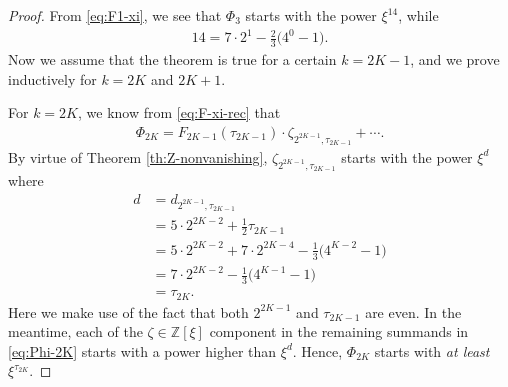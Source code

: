 \documentclass[12pt,reqno]{amsart}
\numberwithin{equation}{section}
\theoremstyle{theorem}
\theoremstyle{definition}
\begin{document}
\begin{proof}
	From \eqref{eq:F1-xi}, we see that $\Phi_3$ starts with the power $\xi^{14}$, while
	\begin{align*}
		14 = 7\cdot 2^1 - \tfrac{2}{3}\big(4^0-1\big).
	\end{align*}
	Now we assume that the theorem is true for a certain $k=2K-1$, and we prove inductively for $k=2K$ and $2K+1$.
	
	For $k=2K$, we know from \eqref{eq:F-xi-rec} that
	\begin{align}\label{eq:Phi-2K}
		\Phi_{2K} = F_{2K-1}(\tau_{2K-1}) \cdot \zeta_{2^{2K-1},\tau_{2K-1}} + \cdots.
	\end{align}
	By virtue of Theorem \ref{th:Z-nonvanishing}, $\zeta_{2^{2K-1},\tau_{2K-1}}$ starts with the power $\xi^{d}$ where
	\begin{align*}
		d&=d_{2^{2K-1},\tau_{2K-1}}\\
		&=5\cdot 2^{2K-2}+\tfrac{1}{2}\tau_{2K-1}\\
		&=5\cdot 2^{2K-2}+7\cdot 2^{2K-4}-\tfrac{1}{3}\big(4^{K-2}-1\big)\\
		&=7\cdot 2^{2K-2}-\tfrac{1}{3}\big(4^{K-1}-1\big)\\
		&=\tau_{2K}.
	\end{align*}
	Here we make use of the fact that both $2^{2K-1}$ and $\tau_{2K-1}$ are even. In the meantime, each of the $\zeta \in \mathbb{Z}[\xi]$ component in the remaining summands in \eqref{eq:Phi-2K} starts with a power higher than $\xi^d$. Hence, $\Phi_{2K}$ starts with \emph{at least} $\xi^{\tau_{2K}}$.
	

\end{proof}
\end{document}
